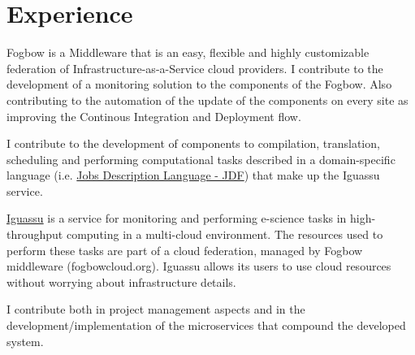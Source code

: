 \documentclass[]{deedy-resume-openfont}
\begin{document}
\begin{minipage}[t]{0.66\textwidth} 


\section{Experience}


\vspace{\topsep} %
\begin{tightemize}
\item Fogbow is a Middleware that is an easy, flexible and highly customizable federation of Infrastructure-as-a-Service cloud providers. I contribute to the development of a monitoring solution to the components of the Fogbow. Also contributing to the automation of the update of the components on every site as improving the Continous Integration and Deployment flow.
\end{tightemize}
\sectionsep


\vspace{\topsep} %
\begin{tightemize}
\item I contribute to the development of components to compilation, translation, scheduling and performing computational tasks described in a domain-specific language (i.e. \href{http://ourgrid.lsd.ufcg.edu.br/use.php#site1}{Jobs Description Language - JDF}) that make up the Iguassu service.
\item \href{https://github.com/ufcg-lsd/iguassu}{Iguassu} is a service for monitoring and performing e-science tasks in high-throughput computing in a multi-cloud environment. The resources used to perform these tasks are part of a cloud federation, managed by Fogbow middleware (fogbowcloud.org). Iguassu allows its users to use cloud resources without worrying about infrastructure details.  
\item I contribute both in project management aspects and in the development/implementation of the microservices that compound the developed system.
\end{tightemize}
\sectionsep


\end{minipage}
\end{document}
